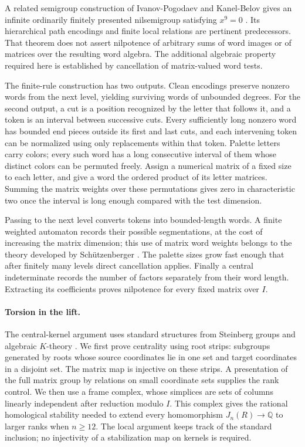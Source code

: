 \documentclass[11pt]{article}
\numberwithin{equation}{section}
\theoremstyle{definition}
\theoremstyle{remark}
\newcommand{\Q}{\mathbb Q}
\begin{document}
A related semigroup construction of Ivanov-Pogodaev and Kanel-Belov
gives an infinite ordinarily finitely presented nilsemigroup satisfying
$x^9=0$ \cite{IvanovPogodaevKanelBelov2025}. Its hierarchical path
encodings and finite local relations are pertinent predecessors. That
theorem does not assert nilpotence of arbitrary sums of word images or
of matrices over the resulting word algebra. The additional algebraic
property required here is established by cancellation of matrix-valued
word tests.

The finite-rule construction has two outputs. Clean encodings preserve
nonzero words from the next level, yielding surviving words of unbounded
degrees. For the second output, a cut is a position recognized by the
letter that follows it, and a token is an interval between successive
cuts. Every sufficiently long nonzero word has bounded end pieces
outside its first and last cuts, and each intervening token can be
normalized using only replacements within that token. Palette letters
carry colors; every such word has a long consecutive interval of them
whose distinct colors can be permuted freely. Assign a numerical matrix
of a fixed size to each letter, and give a word the ordered product of
its letter matrices. Summing the matrix
weights over these permutations gives zero in characteristic two once
the interval is long enough compared with the test dimension.

Passing to the next level converts tokens into bounded-length words.
A finite weighted automaton records their possible segmentations, at
the cost of increasing the matrix dimension; this use of matrix word
weights belongs to the theory developed by Sch\"utzenberger
\cite{Schutzenberger1961}. The palette sizes grow fast enough that after
finitely many levels direct cancellation applies. Finally a central
indeterminate records the number of factors separately from their word
length. Extracting its coefficients proves nilpotence for every fixed
matrix over $I$.

\paragraph{Torsion in the lift.}
The central-kernel argument uses standard structures from Steinberg
groups and algebraic $K$-theory \cite{Steinberg1967,WeibelKbook}.
We first prove centrality using root strips: subgroups generated by
roots whose source coordinates lie in one set and target coordinates
in a disjoint set. The matrix map is injective on these strips. A
presentation of the full matrix group by relations on small coordinate
sets supplies the rank control. We then use a frame complex, whose
simplices are sets of columns linearly independent after reduction
modulo $I$. This complex gives the rational homological stability needed
to extend every homomorphism $J_n(R)\to\Q$ to larger ranks when
$n\geq12$. The local argument keeps track of the standard inclusion;
no injectivity of a stabilization map on kernels is required.
\end{document}
